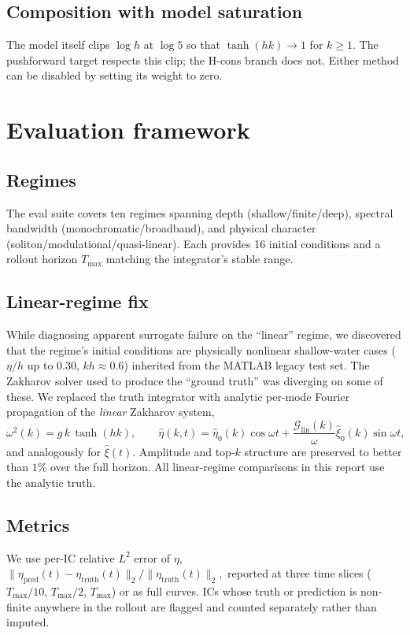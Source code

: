 \documentclass[11pt,letterpaper]{article}
\newcommand{\Gop}{\mathcal{G}}
\begin{document}
\subsection{Composition with model saturation}

The model itself clips $\log h$ at $\log 5$ so that $\tanh(hk)\to 1$ for
$k\geq 1$. The pushforward target respects this clip; the H-cons branch
does not. Either method can be disabled by setting its weight to zero.

\section{Evaluation framework}

\subsection{Regimes}
The eval suite covers ten regimes spanning depth (shallow/finite/deep),
spectral bandwidth (monochromatic/broadband), and physical character
(soliton/modulational/quasi-linear). Each provides 16 initial conditions
and a rollout horizon $T_{\max}$ matching the integrator's stable range.

\subsection{Linear-regime fix}
\label{ssec:linear-fix}

While diagnosing apparent surrogate failure on the ``linear'' regime, we
discovered that the regime's initial conditions are physically nonlinear
shallow-water cases ($\eta/h$ up to $0.30$, $kh\approx 0.6$) inherited
from the MATLAB legacy test set. The Zakharov solver used to produce
the ``ground truth'' was diverging on some of these. We replaced the
truth integrator with analytic per-mode Fourier propagation of the
\emph{linear} Zakharov system,
\[
\omega^2(k) = g\,k\,\tanh(hk),\qquad
\hat\eta(k,t) = \hat\eta_0(k)\cos\omega t
              + \frac{\Gop_{\mathrm{lin}}(k)}{\omega}\hat\xi_0(k)\sin\omega t,
\]
and analogously for $\hat\xi(t)$. Amplitude and top-$k$ structure are
preserved to better than $1\%$ over the full horizon. All linear-regime
comparisons in this report use the analytic truth.

\subsection{Metrics}
We use per-IC relative $L^{2}$ error of $\eta$,
$
\|\eta_{\mathrm{pred}}(t)-\eta_{\mathrm{truth}}(t)\|_2 /
\|\eta_{\mathrm{truth}}(t)\|_2,
$
reported at three time slices ($T_{\max}/10$, $T_{\max}/2$, $T_{\max}$)
or as full curves. ICs whose truth or prediction is non-finite anywhere
in the rollout are flagged and counted separately rather than imputed.
\end{document}
